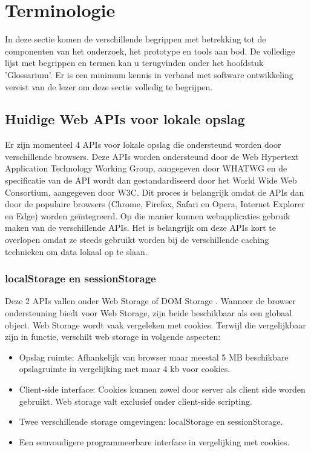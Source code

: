 \section{Terminologie}
\label{sec:terminologie}
In deze sectie komen de verschillende begrippen met betrekking tot de componenten van het onderzoek, het prototype en tools aan bod. De volledige lijst met begrippen en termen kan u terugvinden onder het hoofdstuk 'Glossarium'. Er is een minimum kennis in verband met software ontwikkeling vereist van de lezer om deze sectie volledig te begrijpen.
\subsection{Huidige Web APIs voor lokale opslag}
Er zijn momenteel 4 APIs \autocite{mozilla-overview} voor lokale opslag die ondersteund worden door verschillende browsers. Deze APIs worden ondersteund \autocite{WHATWG-storage-API} door de Web Hypertext Application Technology Working Group, aangegeven door WHATWG en de specificatie van de API wordt dan gestandardiseerd door het World Wide Web Consortium, aangegeven door W3C. Dit proces is belangrijk omdat de APIs dan door de populaire browsers (Chrome, Firefox, Safari en Opera, Internet Explorer en Edge) worden ge\"integreerd. Op die manier kunnen webapplicaties gebruik maken van de verschillende APIs. Het is belangrijk om deze APIs kort te overlopen omdat ze steeds gebruikt worden bij de verschillende caching technieken om data lokaal op te slaan.
\subsubsection{localStorage en sessionStorage}
Deze 2 APIs vallen onder Web Storage of DOM Storage \autocite{clientside-storage}. Wanneer de browser ondersteuning biedt voor Web Storage, zijn beide beschikbaar als een globaal object. Web Storage wordt vaak vergeleken met cookies. Terwijl die vergelijkbaar zijn in functie, verschilt web storage in volgende aspecten: 
\begin{itemize}  
\item Opslag ruimte: Afhankelijk van browser maar meestal 5 MB beschikbare opslagruimte in vergelijking met maar 4 kb voor cookies.
\item Client-side interface: Cookies kunnen zowel door server als client side worden gebruikt. Web storage valt exclusief onder client-side scripting.
\item Twee verschillende storage omgevingen: localStorage en sessionStorage.
\item Een eenvoudigere programmeerbare interface in vergelijking met cookies.
\end{itemize}
\clearpage
